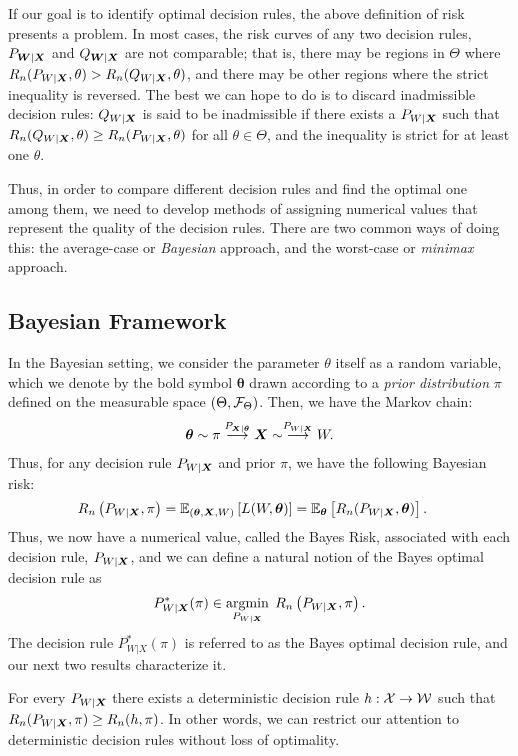 \documentclass[12pt]{article}
\begin{document}
If our goal is to identify {optimal} decision rules, the above definition of risk presents a problem. In most cases, the risk curves of any two decision rules, $P_{{\boldsymbol W}|{\boldsymbol X}}$ and $Q_{{\boldsymbol W}|{\boldsymbol X}}$ are not comparable; that is, there may be regions in $\Theta$ where $R_n(P_{W|{\boldsymbol X}}, \theta) > R_n(Q_{W|{\boldsymbol X}}, \theta)$, and there may be other regions where the strict inequality is reversed. The best we can hope to do is to discard inadmissible decision rules: $Q_{W|{\boldsymbol X}}$ is said to be inadmissible  if there exists a $P_{W|{\boldsymbol X}}$ such that $R_n(Q_{W|{\boldsymbol X}}, \theta) \geq R_n(P_{W|{\boldsymbol X}}, \theta)$ for all $\theta \in \Theta$, and the inequality is strict for at least one $\theta$. 

Thus, in order to compare different decision rules and find the optimal one among them, we need to develop methods of assigning numerical values that represent the quality of the decision rules. There are two common ways of doing this: the average-case or \emph{Bayesian} approach, and the worst-case or \emph{minimax} approach.



\subsection{Bayesian Framework}
In the Bayesian setting, we consider the parameter $\theta$ itself as a random variable, which we denote by the bold symbol $\boldsymbol{\theta}$ drawn according to a \emph{prior distribution} $\pi$ defined on the measurable space $(\Theta, {\cal F}_\Theta)$.  Then, we have the Markov chain: 
\begin{align}
	\boldsymbol{\theta} \sim \pi \stackrel{P_{{\boldsymbol X}|\boldsymbol{\theta}}}{\longrightarrow} {\boldsymbol X} \sim  \stackrel{P_{W|{\boldsymbol X}}}{\longrightarrow} W. 
\end{align}
Thus, for any decision rule $P_{W|{\boldsymbol X}}$ and prior $\pi$, we have the following Bayesian risk: 
\begin{align}
	R_n\left( P_{W|{\boldsymbol X}}, \pi \right) & = \mathbb{E}_{(\boldsymbol{\theta}, {\boldsymbol X}, W)} \left[ L(W, \boldsymbol{\theta}) \right] = \mathbb{E}_{\boldsymbol{\theta}} \left[ R_n(P_{W|{\boldsymbol X}}, \boldsymbol{\theta}) \right].  
\end{align}
Thus, we now have a numerical value, called the Bayes Risk, associated with each decision rule, $P_{W|{\boldsymbol X}}$, and we can define a natural notion of the Bayes optimal decision rule as 
\begin{align}
	 P^{*}_{W|{\boldsymbol X}}(\pi) \in \operatorname*{argmin}_{P_{W|{\boldsymbol X}}} \; R_n\left( P_{W|{\boldsymbol X}}, \pi \right). 
\end{align}
The decision rule $P^*_{W|X}(\pi)$ is referred to as the Bayes optimal decision rule, and our next two results characterize it. 
\begin{lemma}
	\label{lemma:bayes-deterministic} For every $P_{W|{\boldsymbol X}}$ there exists a deterministic decision rule $h:{\cal X} \to {\cal W}$ such that $R_n(P_{W|{\boldsymbol X}}, \pi) \geq R_n(h, \pi)$. In other words, we can restrict our attention to deterministic decision rules without loss of optimality. 
\end{lemma}
\end{document}
